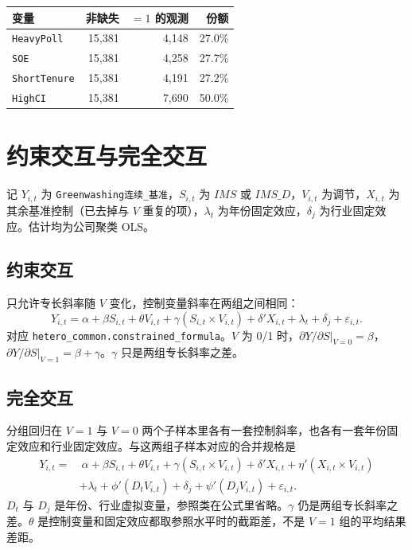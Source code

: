 \documentclass[11pt]{article}
\begin{document}
\begin{center}
\begin{threeparttable}
\caption{文献导向调节覆盖（\(N=15{,}381\)）}
\label{tab:lit-cov}
\begin{tabular}{lrrr}
\toprule
变量 & 非缺失 & \(=1\) 的观测 & 份额 \\
\midrule
\texttt{HeavyPoll} & 15,381 & 4,148 & 27.0\% \\
\texttt{SOE} & 15,381 & 4,258 & 27.7\% \\
\texttt{ShortTenure} & 15,381 & 4,191 & 27.2\% \\
\texttt{HighCI} & 15,381 & 7,690 & 50.0\% \\
\bottomrule
\end{tabular}
\end{threeparttable}
\end{center}

\section{约束交互与完全交互}

记 \(Y_{i,t}\) 为 \texttt{Greenwashing连续\_基准}，\(S_{i,t}\) 为 \(IMS\) 或 \(IMS\_D\)，\(V_{i,t}\) 为调节，\(X_{i,t}\) 为其余基准控制（已去掉与 \(V\) 重复的项），\(\lambda_t\) 为年份固定效应，\(\delta_j\) 为行业固定效应。估计均为公司聚类 OLS。

\subsection{约束交互}

只允许专长斜率随 \(V\) 变化，控制变量斜率在两组之间相同：
\begin{equation}
Y_{i,t}=\alpha+\beta S_{i,t}+\theta V_{i,t}+\gamma (S_{i,t}\times V_{i,t})+\delta'X_{i,t}+\lambda_t+\delta_j+\varepsilon_{i,t}.
\label{eq:constrained}
\end{equation}
对应 \texttt{hetero\_common.constrained\_formula}。\(V\) 为 0/1 时，\(\partial Y/\partial S|_{V=0}=\beta\)，\(\partial Y/\partial S|_{V=1}=\beta+\gamma\)。\(\gamma\) 只是两组专长斜率之差。

\subsection{完全交互}

分组回归在 \(V=1\) 与 \(V=0\) 两个子样本里各有一套控制斜率，也各有一套年份固定效应和行业固定效应。与这两组子样本对应的合并规格是
\begin{equation}
\begin{aligned}
Y_{i,t}=&\ \alpha+\beta S_{i,t}+\theta V_{i,t}+\gamma (S_{i,t}\times V_{i,t})+\delta'X_{i,t}+\eta'(X_{i,t}\times V_{i,t})\\
&+\lambda_t+\phi'(D_t V_{i,t})+\delta_j+\psi'(D_j V_{i,t})+\varepsilon_{i,t}.
\end{aligned}
\label{eq:full}
\end{equation}
\(D_t\) 与 \(D_j\) 是年份、行业虚拟变量，参照类在公式里省略。\(\gamma\) 仍是两组专长斜率之差。\(\theta\) 是控制变量和固定效应都取参照水平时的截距差，不是 \(V=1\) 组的平均结果差距。
\end{document}
